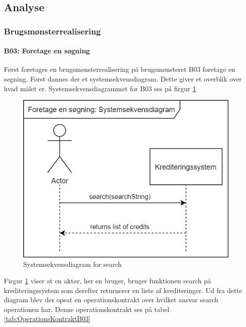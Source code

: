 \subsection{Analyse}

\subsubsection{Brugsmønsterrealisering}

\paragraph{B03: Foretage en søgning} Først foretages en brugsmønsterrealisering på brugsmønsteret B03 foretage en søgning. Først dannes der et systemsekvensdiagram. Dette giver et overblik over hvad målet er. Systemsekvensdiagrammet for B03 ses på firgur \ref{fig:SystemsekvensdiagramSearch} 

\begin{figure}[H]
    \centering
\includegraphics[scale = 0.5]{images/B03SSD.png}
    \caption{Systemsekvensdiagram for search}
    \label{fig:SystemsekvensdiagramSearch}
\end{figure}

Firgur \ref{fig:SystemsekvensdiagramSearch} viser at en aktør, her en bruger, bruger funktionen search på krediteringssystem som derefter returnerer en liste af krediteringer. Ud fra dette diagram blev der opsat en operationskontrakt over hvilket ansvar search operationen har. Denne operationskontrakt ses på tabel \ref{tab:OperationsKontraktB03}

